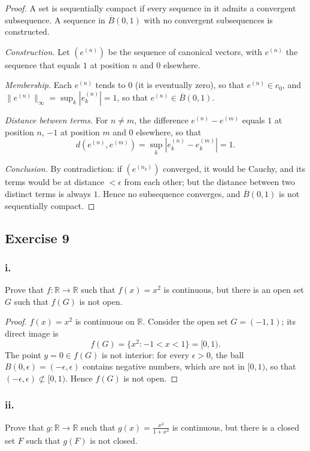 \documentclass[11pt, a4paper]{article}
\begin{document}
\begin{proof}
A set is sequentially compact if every sequence in it admits a convergent subsequence.
A sequence in $\overline{B}(0, 1)$ with no convergent subsequences is constructed.

\textit{Construction.} Let $(e^{(n)})$ be the sequence of canonical vectors, with $e^{(n)}$ the sequence
that equals $1$ at position $n$ and $0$ elsewhere.

\textit{Membership.} Each $e^{(n)}$ tends to $0$ (it is eventually zero), so that $e^{(n)} \in c_0$,
and $\|e^{(n)}\|_\infty = \sup_k |e^{(n)}_k| = 1$, so that $e^{(n)} \in \overline{B}(0, 1)$.

\textit{Distance between terms.} For $n \neq m$, the difference $e^{(n)} - e^{(m)}$ equals $1$ at
position $n$, $-1$ at position $m$ and $0$ elsewhere, so that
$$ d(e^{(n)}, e^{(m)}) = \sup_k |e^{(n)}_k - e^{(m)}_k| = 1. $$

\textit{Conclusion.} By contradiction: if $(e^{(n_k)})$ converged, it would be Cauchy, and its terms would be at
distance $< \epsilon$ from each other; but the distance between two distinct terms is always $1$. Hence
no subsequence converges, and $\overline{B}(0, 1)$ is not sequentially compact.
\end{proof}

\subsection*{Exercise 9}

\subsubsection*{i.}
Prove that $f: \mathbb{R} \to \mathbb{R}$ such that $f(x) = x^2$ is continuous, but there is an open set
$G$ such that $f(G)$ is not open.

\begin{proof}
$f(x) = x^2$ is continuous on $\mathbb{R}$. Consider the open set $G = (-1, 1)$; its direct image is
$$ f(G) = \{ x^2 : -1 < x < 1 \} = [0, 1). $$
The point $y = 0 \in f(G)$ is not interior: for every $\epsilon > 0$, the ball
$B(0, \epsilon) = (-\epsilon, \epsilon)$ contains negative numbers, which are not in $[0, 1)$, so
that $(-\epsilon, \epsilon) \not\subset [0, 1)$. Hence $f(G)$ is not open.
\end{proof}

\subsubsection*{ii.}
Prove that $g: \mathbb{R} \to \mathbb{R}$ such that $g(x) = \frac{x^2}{1+x^2}$ is continuous, but
there is a closed set $F$ such that $g(F)$ is not closed.
\end{document}
